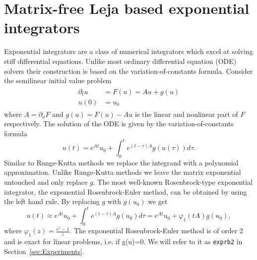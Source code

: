 \documentclass{scrartcl}
\begin{document}
\section{Matrix-free Leja based exponential integrators} \label{sec:expint}
	Exponential integrators are a class of numerical integrators which excel at solving stiff differential equations. Unlike most ordinary differential equation (ODE) solvers their construction is based on the variation-of-constants formula. Consider the semilinear initial value problem
	\begin{align}
	\begin{split}
	\partial_tu &= F(u) = Au + g(u) \\ 
	u(0) &= u_0
	\end{split}\label{semilinear}
	\end{align}
	where $A = \partial_uF$ and $g(u) = F(u)-Au$ is the linear and nonlinear part of $F$ respectively. The solution of the ODE is given by the variation-of-constants formula
	\[
	u(t) = e^{At}u_0 + \int_{0}^{t}e^{(t-\tau)A}g(u(\tau))d\tau.
	\]
	Similar to Runge-Kutta methods we replace the integrand with a polynomial approximation. Unlike Runge-Kutta methods we leave the matrix exponential untouched and only replace $g$. The most well-known Rosenbrock-type exponential integrator, the exponential Rosenbrock-Euler method, can be obtained by using the left hand rule. By replacing $g$ with $g(u_0)$ we get
	\[
	u(t) \approx e^{At}u_0 + \int_{0}^{t}e^{(t-\tau)A}g(u_0)d\tau = e^{At}u_0 + \varphi_1(tA)g(u_0),
	\]
	where $\varphi_1(z) = \frac{e^z-1}z$. The exponential Rosenbrock-Euler method is of order 2 and is exact for linear problems, i.e. if g(u)=0. We will refer to it as \texttt{exprb2} in Section~\ref{sec:Experiments}.
\end{document}
